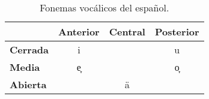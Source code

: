 \begin{table}[h!]
	\centering\small
	\begin{tabular}{lccc}
		\toprule	
		& \textbf{Anterior} & \textbf{Central} & \textbf{Posterior}  \\
		\midrule
		\textbf{Cerrada}          &  i  &   & u    \\
		\textbf{Media}       & e̞  &   &o̞   \\
		\textbf{Abierta}       &     & ä  &   \\
		\bottomrule
	\end{tabular}
	\caption{Fonemas vocálicos del español.}
	\label{tab:vocales}
\end{table}

